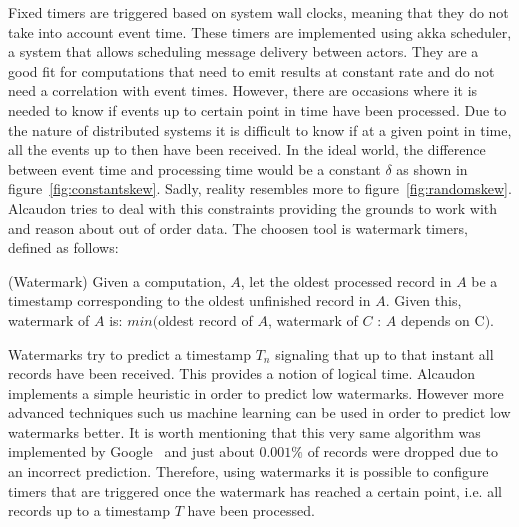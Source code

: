 Fixed timers are triggered based on system wall clocks, meaning that they do not
take into account event time. These timers are implemented using akka scheduler,
a system that allows scheduling message delivery between actors. They are a good
fit for computations that need to emit results at constant rate and do not need
a correlation with event times. However, there are occasions where it is needed
to know if events up to certain point in time have been processed. Due to the
nature of distributed systems it is difficult to know if at a given point in time,
all the events up to then have been received. In the ideal world, the
difference between event time and processing time would be a constant $\delta$ as
shown in figure~\ref{fig:constantskew}. Sadly, reality resembles more
to figure~\ref{fig:randomskew}. Alcaudon tries to deal with this constraints
providing the grounds to work with and reason about out of order data. The choosen tool
is watermark timers, defined as follows:

\begin{definition}{(Watermark)}
Given a computation, $A$, let the oldest processed record in $A$ be a timestamp
corresponding to the oldest unfinished record in $A$.
Given this, watermark of $A$ is:
$min($oldest record of $A$, watermark of $C$ : $A$ depends on C$)$.
\end{definition}

Watermarks try to predict a timestamp $T_n$ signaling that up to that instant
all records have been received. This provides a notion of logical time. Alcaudon
implements a simple heuristic in order to predict low watermarks. However more
advanced techniques such us machine learning can be used in order to predict low
watermarks better. It is worth mentioning that this very same algorithm was
implemented by Google~\cite{millwheel} and just about $0.001\%$ of records were
dropped due to an incorrect prediction. Therefore, using watermarks it is
possible to configure timers that are triggered once the watermark has reached a
certain point, i.e. all records up to a timestamp $T$ have been processed.

